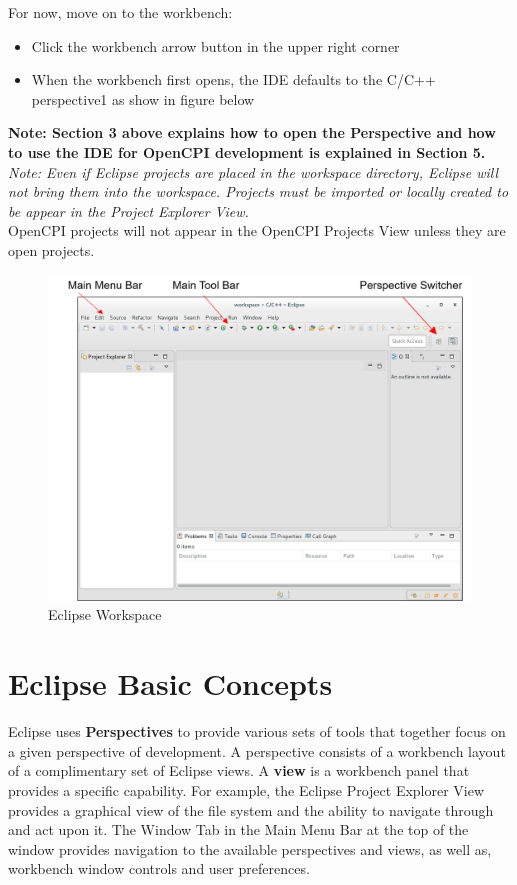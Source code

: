 \documentclass[10pt, a4paper, oneside]{article}
\begin{document}
\begin{appendices}
For now, move on to the workbench:
\begin{itemize}
\item Click the workbench arrow button in the upper right corner
\item When the workbench first opens, the IDE defaults to the C/C++ perspective1 as show in figure below
\end{itemize}
 {\textbf {Note: Section 3 above explains how to open the Perspective and how to use the IDE for OpenCPI development is explained in Section 5.}}\\

\emph{Note: Even if Eclipse projects are placed in the workspace directory, Eclipse will not bring them into the workspace. Projects must be imported or locally created to be appear in the Project Explorer View.}\\

OpenCPI projects will not appear in the OpenCPI Projects View unless they are open projects.\\

\begin{figure}[h!]
	\centering
	\caption{Eclipse Workspace}{}
	\includegraphics[width=\textwidth]{EclipseWorkspace.png}
 \end{figure}
\newpage
\section{Eclipse Basic Concepts}
Eclipse uses \textbf{Perspectives} to provide various sets of tools that together focus on a given perspective of development. A perspective consists of a workbench layout of a complimentary set of Eclipse views. A \textbf{view} is a workbench panel that provides a specific capability. For example, the Eclipse Project Explorer View provides a graphical view of the file system and the ability to navigate through and act upon it. The Window Tab in the Main Menu Bar at the top of the window provides navigation to the available perspectives and views, as well as, workbench window controls and user preferences. \\


\end{appendices}
\end{document}
